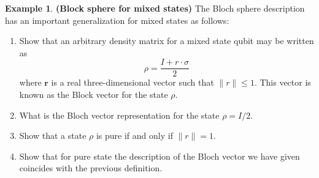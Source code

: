 \documentclass[12pt, oneside]{book}
\theoremstyle{definition}
\theoremstyle{definition}
\newtheorem{example}{Example}[section]
\theoremstyle{remark}
\begin{document}
\begin{example}
    \textbf{(Block sphere for mixed states)} The Bloch sphere description has an important generalization for mixed states as follows:
    \begin{enumerate}
        \item Show that an arbitrary density matrix for a mixed state qubit may be written as 
        \[
        \rho = \frac{I+r \cdot \sigma}{2}
        \]
        where $\mathbf{r}$ is a real three-dimensional vector such that $\|r\|\leq 1$. This vector is known as the Block vector for the state $\rho$.
        \item What is the Bloch vector representation for the state $\rho=I/2$.
        \item Show that a state $\rho$ is pure if and only if $\|r\|=1$.
        \item Show that for pure state the description of the Bloch vector we have given coincides with the previous definition.
    \end{enumerate}


\end{example}
\end{document}
